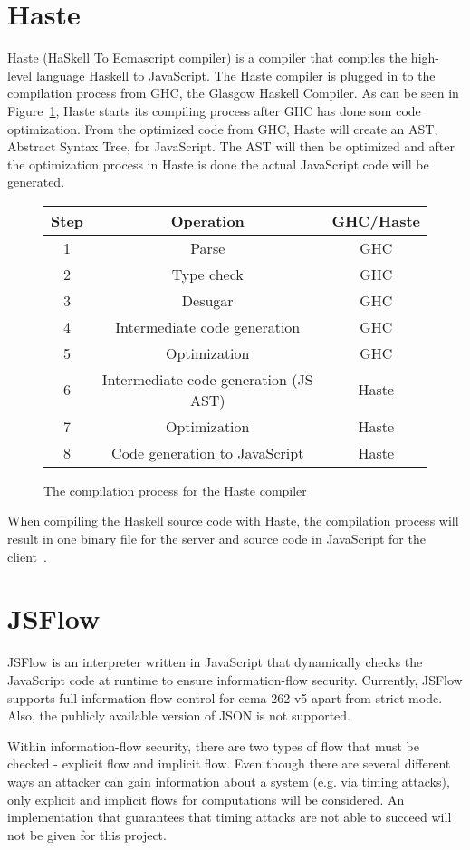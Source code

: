 \section{Haste}
Haste (HaSkell To Ecmascript compiler) is a compiler that compiles the high-level language Haskell to JavaScript. The Haste compiler is plugged in to the compilation process from GHC, the Glasgow Haskell Compiler. As can be seen in Figure~\ref{fig:system}, Haste starts its compiling process after GHC has done som code optimization. From the optimized code from GHC, Haste will create an AST, Abstract Syntax Tree, for JavaScript. The AST will then be optimized and after the optimization process in Haste is done the actual JavaScript code will be generated.
\begin{figure}[h]
  \begin{tabular}{|c|c|c|}
    \hline
    Step & Operation & GHC/Haste \\
    \hline
    1 & Parse & GHC \\
    2 & Type check & GHC \\
    3 & Desugar & GHC \\
    4 & Intermediate code generation & GHC \\
    5 & Optimization & GHC \\
    6 & Intermediate code generation (JS AST) & Haste \\
    7 & Optimization & Haste \\
    8 & Code generation to JavaScript & Haste \\
    \hline
  \end{tabular}
  \caption{The compilation process for the Haste compiler}
  \label{fig:system}
\end{figure}

When compiling the Haskell source code with Haste, the compilation process will result in one binary file for the server and source code in JavaScript for the client~\cite{haste-symposium}.

\section{JSFlow}
JSFlow is an interpreter written in JavaScript that dynamically checks the JavaScript code at runtime to ensure information-flow security. Currently, JSFlow supports full information-flow control for ecma-262 v5 apart from strict mode. Also, the publicly available version of JSON is not supported.

Within information-flow security, there are two types of flow that must be checked - explicit flow and implicit flow. Even though there are several different ways an attacker can gain information about a system (e.g. via timing attacks), only explicit and implicit flows for computations will be considered. An implementation that guarantees that timing attacks are not able to succeed will not be given for this project.
